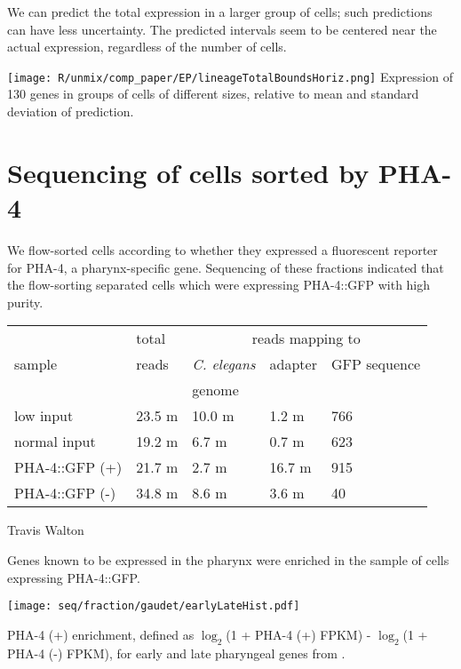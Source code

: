 \documentclass[landscape,a0]{a0poster}
\begin{document}
\begin{multicols}{4}
We can predict the total expression in a larger group of cells;
such predictions can have less uncertainty.
The predicted intervals seem to be centered near the actual expression, regardless of the
number of cells.

\texttt{[image: R/unmix/comp\_paper/EP/lineageTotalBoundsHoriz.png]}
{\small
Expression of 130 genes in groups of cells of different sizes, relative to mean and standard deviation of prediction.
}

\section*{Sequencing of cells sorted by PHA-4}

We flow-sorted cells according to whether they expressed a fluorescent reporter for
PHA-4, a pharynx-specific gene. Sequencing of these fractions indicated that the
flow-sorting separated cells which were expressing PHA-4::GFP with high purity.

\begin{minipage}[b]{1\linewidth}
\begin{tabular}{lllll}
\hline
& total& \multicolumn{3}{c}{reads mapping to} \\
sample & reads & {\em C. elegans} & adapter & GFP sequence \\
  & & genome & &  \\
\hline
low input  & 23.5 m & 10.0 m & 1.2 m & 766 \\
normal input & 19.2 m & 6.7 m & 0.7 m & 623 \\
PHA-4::GFP (+) & 21.7 m & 2.7 m & 16.7 m & 915 \\
PHA-4::GFP (-) & 34.8 m & 8.6 m & 3.6 m & 40 \\
\hline
\end{tabular}
\vspace{5mm}

\hfill Travis Walton
\end{minipage}

Genes known to be expressed in the pharynx \cite{gaudet2004} were enriched in the sample
of cells expressing PHA-4::GFP.

\begin{minipage}[b]{1\linewidth}
\texttt{[image: seq/fraction/gaudet/earlyLateHist.pdf]}

{\small PHA-4 (+) enrichment, defined as
$\log_2$(1 + PHA-4 (+) FPKM) - $\log_2$(1 + PHA-4 (-) FPKM),
for early and late pharyngeal
genes from \cite{gaudet2004}.}


\end{minipage}
\end{multicols}
\end{document}
